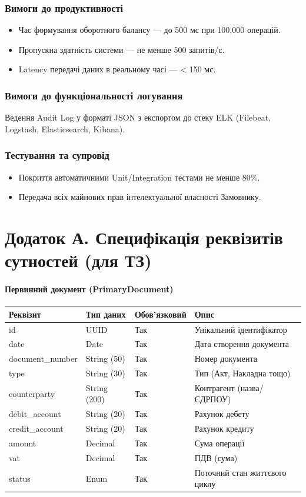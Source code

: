 \documentclass{article}
\begin{document}
\subsubsection{Вимоги до продуктивності}
\begin{itemize}
    \item Час формування оборотного балансу --- до 500 мс при 100,000 операцій.
    \item Пропускна здатність системи --- не менше 500 запитів/с.
    \item Latency передачі даних в реальному часі --- < 150 мс.
\end{itemize}

\subsubsection{Вимоги до функціональності логування}
Ведення Audit Log у форматі JSON з експортом до стеку ELK (Filebeat, Logstash, Elasticsearch, Kibana).

\subsubsection{Тестування та супровід}
\begin{itemize}
    \item Покриття автоматичними Unit/Integration тестами не менше 80\%.
    \item Передача всіх майнових прав інтелектуальної власності Замовнику.
\end{itemize}

\newpage
\appendix
\section{Додаток А. Специфікація реквізитів сутностей (для ТЗ)}

\paragraph{Первинний документ (PrimaryDocument)}
\begin{longtable}{p{3.5cm}p{3cm}p{2cm}p{5.5cm}}
\toprule
\textbf{Реквізит} & \textbf{Тип даних} & \textbf{Обов'язковий} & \textbf{Опис} \\
\midrule
id & UUID & Так & Унікальний ідентифікатор \\
date & Date & Так & Дата створення документа \\
document\_number & String (50) & Так & Номер документа \\
type & String (30) & Так & Тип (Акт, Накладна тощо) \\
counterparty & String (200) & Так & Контрагент (назва/ЄДРПОУ) \\
debit\_account & String (20) & Так & Рахунок дебету \\
credit\_account & String (20) & Так & Рахунок кредиту \\
amount & Decimal & Так & Сума операції \\
vat & Decimal & Так & ПДВ (сума) \\
status & Enum & Так & Поточний стан життєвого циклу \\
\bottomrule
\end{longtable}
\end{document}
